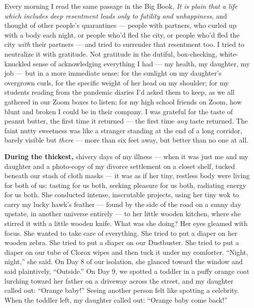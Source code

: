 Every morning I read the same passage in the Big Book, \emph{It is plain
that a life which includes deep resentment leads only to futility and
unhappiness}, and thought of other people's quarantines --- people with
partners, who curled up with a body each night, or people who'd fled the
city, or people who'd fled the city \emph{with} their partners --- and
tried to surrender that resentment too. I tried to neutralize it with
gratitude. Not gratitude in the dutiful, box-checking, white-knuckled
sense of acknowledging everything I had --- my health, my daughter, my
job --- but in a more immediate sense: for the sunlight on my daughter's
overgrown curls, for the specific weight of her head on my shoulder; for
my students reading from the pandemic diaries I'd asked them to keep, as
we all gathered in our Zoom boxes to listen; for my high school friends
on Zoom, how blunt and broken I could be in their company. I was
grateful for the taste of peanut butter, the first time it returned ---
the first time \emph{any} taste returned. The faint nutty sweetness was
like a stranger standing at the end of a long corridor, barely visible
but \emph{there} --- more than six feet away, but better than no one at
all.

\textbf{During the thickest,} shivery days of my illness --- when it was
just me and my daughter and a photo-copy of my divorce settlement on a
closet shelf, tucked beneath our stash of cloth masks --- it was as if
her tiny, restless body were living for both of us: tasting for us both,
seeking pleasure for us both, radiating energy for us both. She
conducted intense, inscrutable projects, using her tiny wok to carry my
lucky hawk's feather --- found by the side of the road on a sunny day
upstate, in another universe entirely --- to her little wooden kitchen,
where she stirred it with a little wooden knife. What was she doing? Her
eyes gleamed with focus. She wanted to take care of everything. She
tried to put a diaper on her wooden zebra. She tried to put a diaper on
our Dustbuster. She tried to put a diaper on our tube of Clorox wipes
and then tuck it under my comforter. ``Night, night,'' she said. On Day
8 of our isolation, she glanced toward the window and said plaintively,
``Outside.'' On Day 9, we spotted a toddler in a puffy orange coat
lurching toward her father on a driveway across the street, and my
daughter called out: ``Orange baby!'' Seeing another person felt like
spotting a celebrity. When the toddler left, my daughter called out:
``Orange baby come back!''

